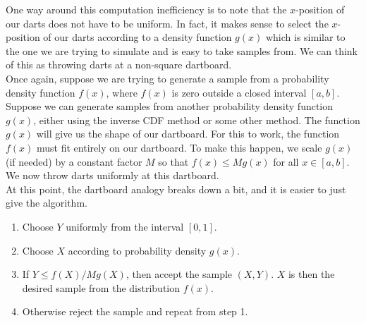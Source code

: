 \documentclass[notes.tex]{subfiles}
\begin{document}
One way around this computation inefficiency is to note that the $x$-position of our darts does not have to be uniform. In fact, it makes sense to select the $x$-position of our darts according to a density function $g(x)$ which is similar to the one we are trying to simulate and is easy to take samples from. We can think of this as throwing darts at a non-square dartboard. \\

Once again, suppose we are trying to generate a sample from a probability density function $f(x)$, where $f(x)$ is zero outside a closed interval $[a, b]$. Suppose we can generate samples from another probability density function $g(x)$, either using the inverse CDF method or some other method. The function $g(x)$ will give us the shape of our dartboard. For this to work, the function $f(x)$ must fit entirely on our dartboard. To make this happen, we scale $g(x)$ (if needed) by a constant factor $M$ so that $f(x) \leq M g(x)$ for all $x \in [a, b]$. We now throw darts uniformly at this dartboard. \\

At this point, the dartboard analogy breaks down a bit, and it is easier to just give the algorithm.
\begin{enumerate}
\item Choose $Y$ uniformly from the interval $[0,1]$.
\item Choose $X$ according to probability density $g(x)$.
\item If $Y \leq f(X) / M g(X)$, then accept the sample $(X, Y)$. $X$ is then the desired sample from the distribution $f(x)$.
\item Otherwise reject the sample and repeat from step 1.
\end{enumerate}
\end{document}
